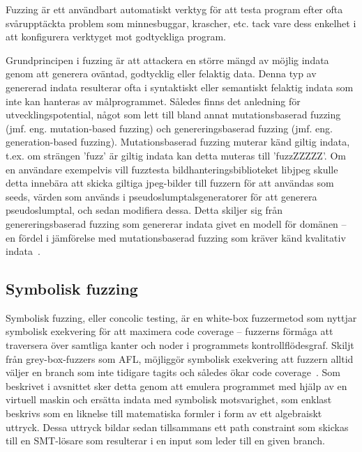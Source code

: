 Fuzzing är ett användbart automatiskt verktyg för att testa program efter ofta
svårupptäckta problem som minnesbuggar, krascher, etc. tack vare dess enkelhet i
att konfigurera verktyget mot godtyckliga program.  

Grundprincipen i fuzzing är att attackera en större mängd av möjlig indata genom
att generera oväntad, godtycklig eller felaktig data. Denna typ av genererad
indata resulterar ofta i syntaktiskt eller semantiskt felaktig indata som inte
kan hanteras av målprogrammet. Således finns det anledning för
utvecklingspotential, något som lett till bland annat mutationsbaserad fuzzing
(jmf. eng. mutation-based fuzzing) och genereringsbaserad fuzzing (jmf. eng.
generation-based fuzzing). Mutationsbaserad fuzzing muterar känd giltig indata,
t.ex. om strängen 'fuzz' är giltig indata kan detta muteras till 'fuzzZZZZZ'. Om
en användare exempelvis vill fuzztesta bildhanteringsbiblioteket libjpeg skulle
detta innebära att skicka giltiga jpeg-bilder till fuzzern för att användas som
seeds, värden som används i pseudoslumptalsgeneratorer för att generera
pseudoslumptal, och sedan modifiera dessa. Detta skiljer sig från
genereringsbaserad fuzzing som genererar indata givet en modell för domänen --
en fördel i jämförelse med mutationsbaserad fuzzing som kräver känd kvalitativ
indata~\cite{fuzzing}. 

\subsection{Symbolisk fuzzing} Symbolisk fuzzing, eller concolic testing, är en
white-box fuzzermetod som nyttjar symbolisk exekvering för att maximera code
coverage -- fuzzerns förmåga att traversera över samtliga kanter och noder i
programmets kontrollflödesgraf. Skiljt från grey-box-fuzzers som AFL, möjliggör
symbolisk exekvering att fuzzern alltid väljer en branch som inte tidigare
tagits och således ökar code coverage~\cite{challenges_fuzzing}. Som beskrivet i
avsnittet  sker detta genom att emulera programmet
med hjälp av en virtuell maskin och ersätta indata med symbolisk motsvarighet,
som enklast beskrivs som en liknelse till matematiska formler i form av ett
algebraiskt uttryck. Dessa uttryck bildar sedan tillsammans ett path constraint
som skickas till en SMT-lösare som resulterar i en input som leder till en given
branch. 

